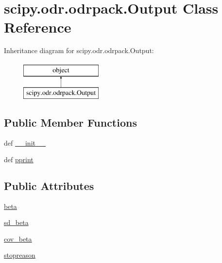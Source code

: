 \hypertarget{classscipy_1_1odr_1_1odrpack_1_1Output}{}\section{scipy.\+odr.\+odrpack.\+Output Class Reference}
\label{classscipy_1_1odr_1_1odrpack_1_1Output}
Inheritance diagram for scipy.\+odr.\+odrpack.\+Output\+:\begin{figure}[H]
\begin{center}
\leavevmode
\includegraphics[height=2.000000cm]{classscipy_1_1odr_1_1odrpack_1_1Output}
\end{center}
\end{figure}
\subsection*{Public Member Functions}
\begin{DoxyCompactItemize}
\item 
def \hyperlink{classscipy_1_1odr_1_1odrpack_1_1Output_a53c0523717831646ae8a20cbc7645968}{\+\_\+\+\_\+init\+\_\+\+\_\+}
\item 
def \hyperlink{classscipy_1_1odr_1_1odrpack_1_1Output_a3602a73c46a59608ed18fb960aebcdce}{pprint}
\end{DoxyCompactItemize}
\subsection*{Public Attributes}
\begin{DoxyCompactItemize}
\item 
\hyperlink{classscipy_1_1odr_1_1odrpack_1_1Output_a29f88ece56b24b13583cc199c13988ac}{beta}
\item 
\hyperlink{classscipy_1_1odr_1_1odrpack_1_1Output_ac15599251123ceb0c17a229cb643e68b}{sd\+\_\+beta}
\item 
\hyperlink{classscipy_1_1odr_1_1odrpack_1_1Output_a2450b71e7350d5eed557a7fa28253749}{cov\+\_\+beta}
\item 
\hyperlink{classscipy_1_1odr_1_1odrpack_1_1Output_a5bd5f021366b91b22c62f76f307dc495}{stopreason}
\end{DoxyCompactItemize}


